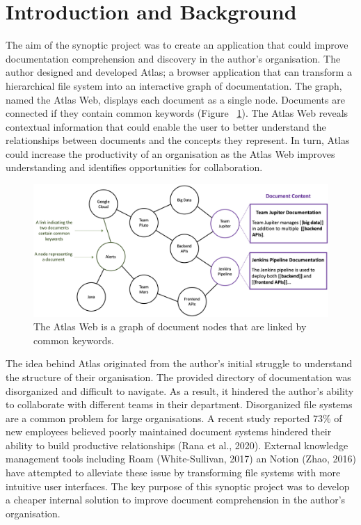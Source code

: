 \documentclass{article}
\begin{document}
\newpage

\tableofcontents

\newpage

\section{Introduction and Background}

The aim of the synoptic project was to create an application that could improve documentation comprehension and discovery in the author's organisation. The author designed and developed Atlas; a browser application that can transform a hierarchical file system into an interactive graph of documentation. The graph, named the Atlas Web, displays each document as a single node. Documents are connected if they contain common keywords (Figure ~\ref{fig:web-intro}). The Atlas Web reveals contextual information that could enable the user to better understand the relationships between documents and the concepts they represent. In turn, Atlas could increase the productivity of an organisation as the Atlas Web improves understanding and identifies opportunities for collaboration. 

\begin{figure}[!htb]
  \centering
      \includegraphics[width=1\textwidth]{images/atlas-web.png}
  \caption{The Atlas Web is a graph of document nodes that are linked by common keywords.}
  \label{fig:web-intro}
\end{figure}


The idea behind Atlas originated from the author's initial struggle to understand the structure of their organisation. The provided directory of documentation was disorganized and difficult to navigate. As a result, it hindered the author's ability to collaborate with different teams in their department. Disorganized file systems are a common problem for large organisations. A recent study reported 73\% of new employees believed poorly maintained document systems hindered their ability to build productive relationships (Rana et al., 2020). External knowledge management tools including Roam (White-Sullivan, 2017) an Notion (Zhao, 2016) have attempted to alleviate these issue by transforming file systems with more intuitive user interfaces. The key purpose of this synoptic project was to develop a cheaper internal solution to improve document comprehension in the author's organisation.
\end{document}
